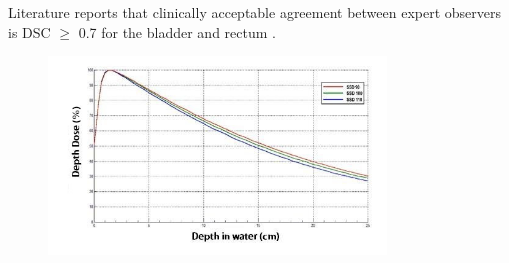 Literature reports that clinically acceptable agreement between expert observers is DSC $\geq$ 0.7 for the bladder and rectum \cite{Roach_2019}.


\begin{figure}[H]
	\begin{center}
		\includegraphics[width=0.8\textwidth]{figures/pdd}
		\caption{}
		\label{fig:pdd}
	\end{center}
\end{figure}
